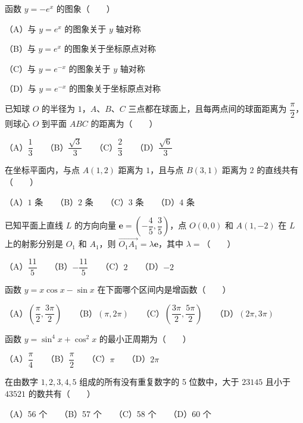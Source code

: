 \begin{question}
函数 $y=-e^x$ 的图象\mbox{（　　）}

（A）与 $y=e^x$ 的图象关于 $y$ 轴对称

（B）与 $y=e^x$ 的图象关于坐标原点对称

（C）与 $y=e^{-x}$ 的图象关于 $y$ 轴对称

（D）与 $y=e^{-x}$ 的图象关于坐标原点对称

\end{question}
\begin{question}
已知球 $O$ 的半径为 $1$，$A\text{、}B\text{、}C$ 三点都在球面上，且每两点间的球面距离为 $\dfrac\pi2$，则球心 $O$ 到平面 $ABC$ 的距离为\mbox{（　　）}

（A）$\dfrac13$　　（B）$\dfrac{\sqrt3}{3}$　　（C）$\dfrac23$　　（D）$\dfrac{\sqrt6}{3}$

\end{question}
\begin{question}
在坐标平面内，与点 $A(1,2)$ 距离为 $1$，且与点 $B(3,1)$ 距离为 $2$ 的直线共有\mbox{（　　）}

（A）$1$ 条　　（B）$2$ 条　　（C）$3$ 条　　（D）$4$ 条

\end{question}
\begin{question}
已知平面上直线 $L$ 的方向向量 $\boldsymbol e=\left(-\dfrac45,\dfrac35\right)$，点 $O(0,0)$ 和 $A(1,-2)$ 在 $L$ 上的射影分别是 $O_1$ 和 $A_1$，则 $\overrightarrow{O_1A_1}=\lambda\boldsymbol e$，其中 $\lambda=$\mbox{（　　）}

（A）$\dfrac{11}{5}$　　（B）$-\dfrac{11}{5}$　　（C）$2$　　（D）$-2$

\end{question}
\begin{question}
函数 $y=x\cos x-\sin x$ 在下面哪个区间内是增函数\mbox{（　　）}

（A）$\left(\dfrac\pi2,\dfrac{3\pi}2\right)$　　（B）$(\pi,2\pi)$　　（C）$\left(\dfrac{3\pi}2,\dfrac{5\pi}2\right)$　　（D）$(2\pi,3\pi)$

\end{question}
\begin{question}
函数 $y=\sin^4x+\cos^2x$ 的最小正周期为\mbox{（　　）}

（A）$\dfrac\pi4$　　（B）$\dfrac\pi2$　　（C）$\pi$　　（D）$2\pi$

\end{question}
\begin{question}
在由数字 $1,2,3,4,5$ 组成的所有没有重复数字的 5 位数中，大于 $23145$ 且小于 $43521$ 的数共有\mbox{（　　）}

（A）56 个　　（B）57 个　　（C）58 个　　（D）60 个

\end{question}


